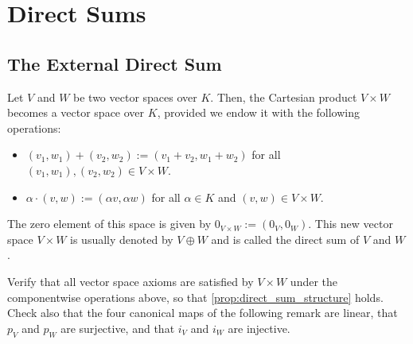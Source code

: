 \setcounter{section}{1}
\renewcommand{\thetheorem}{18.b.\arabic{theorem}}
\setcounter{theorem}{0}
\section{Direct Sums}

\subsection{The External Direct Sum}

\begin{proposition}
  \label{prop:direct_sum_structure}
  Let $V$ and $W$ be two vector spaces over $K$. Then, the Cartesian product $V \times W$ becomes a vector space over $K$, provided we endow it with the following operations:
  \begin{itemize}
    \item $(v_1, w_1) + (v_2, w_2) := (v_1 + v_2, w_1 + w_2)$ for all $(v_1, w_1), (v_2, w_2) \in V \times W$.
    \item $\alpha \cdot (v, w) := (\alpha v, \alpha w)$ for all $\alpha \in K$ and $(v, w) \in V \times W$.
  \end{itemize}
  The zero element of this space is given by $0_{V \times W} := (0_V, 0_W)$. This new vector space $V \times W$ is usually denoted by $V \oplus W$ and is called the direct sum of $V$ and $W$.
\end{proposition}

\begin{exercise}
  \label{exc:direct_sum_axioms}
  Verify that all vector space axioms are satisfied by $V \times W$ under the componentwise operations above, so that \cref{prop:direct_sum_structure} holds. Check also that the four canonical maps of the following remark are linear, that $p_V$ and $p_W$ are surjective, and that $i_V$ and $i_W$ are injective.
\end{exercise}

